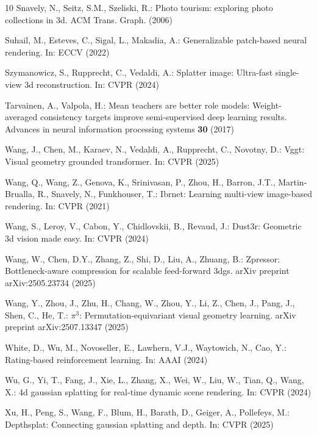 \documentclass[runningheads]{llncs}
\begin{document}
\begin{thebibliography}{10}
Snavely, N., Seitz, S.M., Szeliski, R.: Photo tourism: exploring photo collections in 3d. {ACM} Trans. Graph.  (2006)

Suhail, M., Esteves, C., Sigal, L., Makadia, A.: Generalizable patch-based neural rendering. In: ECCV (2022)

Szymanowicz, S., Rupprecht, C., Vedaldi, A.: Splatter image: Ultra-fast single-view 3d reconstruction. In: CVPR (2024)

Tarvainen, A., Valpola, H.: Mean teachers are better role models: Weight-averaged consistency targets improve semi-supervised deep learning results. Advances in neural information processing systems  \textbf{30} (2017)

Wang, J., Chen, M., Karaev, N., Vedaldi, A., Rupprecht, C., Novotny, D.: Vggt: Visual geometry grounded transformer. In: CVPR (2025)

Wang, Q., Wang, Z., Genova, K., Srinivasan, P., Zhou, H., Barron, J.T., Martin-Brualla, R., Snavely, N., Funkhouser, T.: Ibrnet: Learning multi-view image-based rendering. In: CVPR (2021)

Wang, S., Leroy, V., Cabon, Y., Chidlovskii, B., Revaud, J.: Dust3r: Geometric 3d vision made easy. In: CVPR (2024)

Wang, W., Chen, D.Y., Zhang, Z., Shi, D., Liu, A., Zhuang, B.: Zpressor: Bottleneck-aware compression for scalable feed-forward 3dgs. arXiv preprint arXiv:2505.23734  (2025)

Wang, Y., Zhou, J., Zhu, H., Chang, W., Zhou, Y., Li, Z., Chen, J., Pang, J., Shen, C., He, T.: $\pi^3$: Permutation-equivariant visual geometry learning. arXiv preprint arXiv:2507.13347  (2025)

White, D., Wu, M., Novoseller, E., Lawhern, V.J., Waytowich, N., Cao, Y.: Rating-based reinforcement learning. In: AAAI (2024)

Wu, G., Yi, T., Fang, J., Xie, L., Zhang, X., Wei, W., Liu, W., Tian, Q., Wang, X.: 4d gaussian splatting for real-time dynamic scene rendering. In: CVPR (2024)

Xu, H., Peng, S., Wang, F., Blum, H., Barath, D., Geiger, A., Pollefeys, M.: Depthsplat: Connecting gaussian splatting and depth. In: CVPR (2025)


\end{thebibliography}
\end{document}
